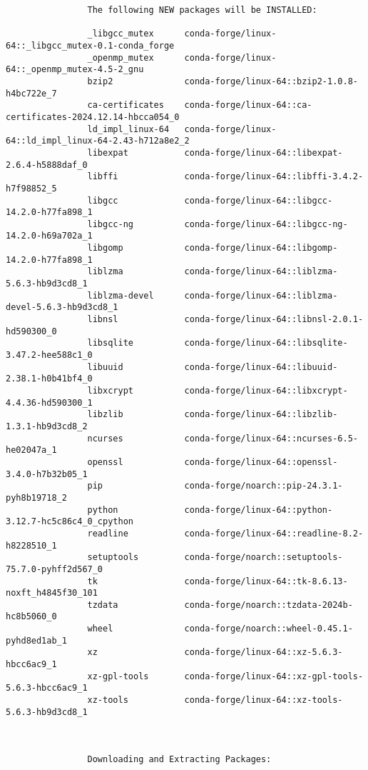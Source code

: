 \documentclass{article}
\begin{document}
\begin{itemize}
\begin{itemize}
\begin{itemize}
\begin{verbatim}
				The following NEW packages will be INSTALLED:
				
				_libgcc_mutex      conda-forge/linux-64::_libgcc_mutex-0.1-conda_forge 
				_openmp_mutex      conda-forge/linux-64::_openmp_mutex-4.5-2_gnu 
				bzip2              conda-forge/linux-64::bzip2-1.0.8-h4bc722e_7 
				ca-certificates    conda-forge/linux-64::ca-certificates-2024.12.14-hbcca054_0 
				ld_impl_linux-64   conda-forge/linux-64::ld_impl_linux-64-2.43-h712a8e2_2 
				libexpat           conda-forge/linux-64::libexpat-2.6.4-h5888daf_0 
				libffi             conda-forge/linux-64::libffi-3.4.2-h7f98852_5 
				libgcc             conda-forge/linux-64::libgcc-14.2.0-h77fa898_1 
				libgcc-ng          conda-forge/linux-64::libgcc-ng-14.2.0-h69a702a_1 
				libgomp            conda-forge/linux-64::libgomp-14.2.0-h77fa898_1 
				liblzma            conda-forge/linux-64::liblzma-5.6.3-hb9d3cd8_1 
				liblzma-devel      conda-forge/linux-64::liblzma-devel-5.6.3-hb9d3cd8_1 
				libnsl             conda-forge/linux-64::libnsl-2.0.1-hd590300_0 
				libsqlite          conda-forge/linux-64::libsqlite-3.47.2-hee588c1_0 
				libuuid            conda-forge/linux-64::libuuid-2.38.1-h0b41bf4_0 
				libxcrypt          conda-forge/linux-64::libxcrypt-4.4.36-hd590300_1 
				libzlib            conda-forge/linux-64::libzlib-1.3.1-hb9d3cd8_2 
				ncurses            conda-forge/linux-64::ncurses-6.5-he02047a_1 
				openssl            conda-forge/linux-64::openssl-3.4.0-h7b32b05_1 
				pip                conda-forge/noarch::pip-24.3.1-pyh8b19718_2 
				python             conda-forge/linux-64::python-3.12.7-hc5c86c4_0_cpython 
				readline           conda-forge/linux-64::readline-8.2-h8228510_1 
				setuptools         conda-forge/noarch::setuptools-75.7.0-pyhff2d567_0 
				tk                 conda-forge/linux-64::tk-8.6.13-noxft_h4845f30_101 
				tzdata             conda-forge/noarch::tzdata-2024b-hc8b5060_0 
				wheel              conda-forge/noarch::wheel-0.45.1-pyhd8ed1ab_1 
				xz                 conda-forge/linux-64::xz-5.6.3-hbcc6ac9_1 
				xz-gpl-tools       conda-forge/linux-64::xz-gpl-tools-5.6.3-hbcc6ac9_1 
				xz-tools           conda-forge/linux-64::xz-tools-5.6.3-hb9d3cd8_1 
				
				
				
				Downloading and Extracting Packages:
				

\end{verbatim}
\end{itemize}
\end{itemize}
\end{itemize}
\end{document}
